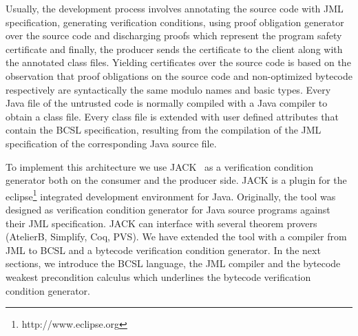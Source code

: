 Usually, the development process involves annotating the source code with JML specification,
 generating verification conditions, using proof obligation generator over the source code and 
discharging proofs which represent the program safety certificate and finally, the producer sends the certificate 
to the client along with the annotated class files.
 Yielding certificates over the source code is based on the observation that
 proof obligations on the source code and non-optimized bytecode respectively
 are syntactically the same modulo names and basic types. Every Java file of the 
untrusted code is normally compiled with a Java compiler to obtain a class file. Every class file is extended with
 user defined attributes that contain the BCSL specification, resulting from the compilation of the
 JML specification of the corresponding Java source file.



    





To implement this architecture we use JACK~\cite{BRL-JACK} as a verification condition generator both on the consumer and the
producer side. JACK is a plugin for the eclipse\footnote{http://www.eclipse.org} integrated development environment for Java.
 Originally, the tool was designed as verification condition generator for Java source programs against their JML specification.
 JACK can interface with several theorem provers (AtelierB, Simplify, Coq, PVS). We have extended the tool with a compiler from
 JML to BCSL and a bytecode verification condition generator. In the next sections, we introduce
 the BCSL language, the JML compiler and the bytecode weakest precondition calculus which underlines the bytecode verification condition generator.
 

